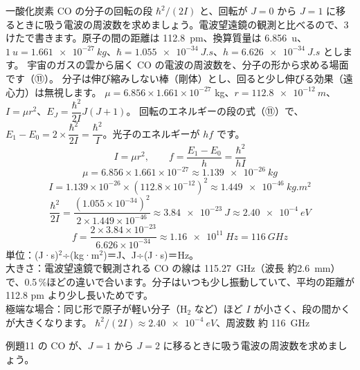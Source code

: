 \label{ph:原-7:ex11}
\begin{phreidai}
一酸化炭素 CO の分子の回転の段 $\hbar^2/(2I)$ と、回転が $J=0$ から $J=1$ に移るときに吸う電波の周波数を求めましょう。電波望遠鏡の観測と比べるので、3けたで書きます。原子の間の距離は \qty{112.8}{pm}、換算質量は \qty{6.856}{u}、$\qty{1}{u}=\qty{1.661e-27}{kg}$、$\hbar=\qty{1.055e-34}{J.s}$、$h=\qty{6.626e-34}{J.s}$ とします。
\phbamen
宇宙のガスの雲から届く CO の電波の周波数を、分子の形から求める場面です（⑪）。
\phmushi
分子は伸び縮みしない棒（剛体）とし、回ると少し伸びる効果（遠心力）は無視します。
\phzu
$\mu=6.856\times1.661\times10^{-27}$ kg、$r=\qty{112.8e-12}{m}$、$I=\mu r^2$、$E_J=\dfrac{\hbar^2}{2I}J(J+1)$。
\phriyu
回転のエネルギーの段の式（⑪）で、$E_1-E_0=2\times\dfrac{\hbar^2}{2I}=\dfrac{\hbar^2}{I}$。光子のエネルギーが $hf$ です。
\phtateru
\[ I=\mu r^2,\qquad f=\frac{E_1-E_0}{h}=\frac{\hbar^2}{hI} \]
\phtoku
\[ \mu=6.856\times1.661\times10^{-27}\approx\qty{1.139e-26}{kg} \]
\[ I=1.139\times10^{-26}\times(112.8\times10^{-12})^2\approx\qty{1.449e-46}{kg.m^2} \]
\[ \frac{\hbar^2}{2I}=\frac{(1.055\times10^{-34})^2}{2\times1.449\times10^{-46}}\approx\qty{3.84e-23}{J}\approx\qty{2.40e-4}{eV} \]
\[ f=\frac{2\times3.84\times10^{-23}}{6.626\times10^{-34}}\approx\qty{1.16e11}{Hz}=\qty{116}{GHz} \]
\phtashikame
単位：(J·s)$^2$÷(kg·m$^2$)＝J、J÷(J·s)＝Hz。\\
大きさ：電波望遠鏡で観測される CO の線は \qty{115.27}{GHz}（波長 約\qty{2.6}{mm}）で、0.5\,\%ほどの違いで合います。分子はいつも少し振動していて、平均の距離が 112.8 pm より少し長いためです。\\
極端な場合：同じ形で原子が軽い分子（H$_2$ など）ほど $I$ が小さく、段の間かくが大きくなります。
\kotae $\hbar^2/(2I)\approx\qty{2.40e-4}{eV}$、周波数 約 \qty{116}{GHz}
\end{phreidai}
\begin{jibun}
例題11 の CO が、$J=1$ から $J=2$ に移るときに吸う電波の周波数を求めましょう。
\end{jibun}

